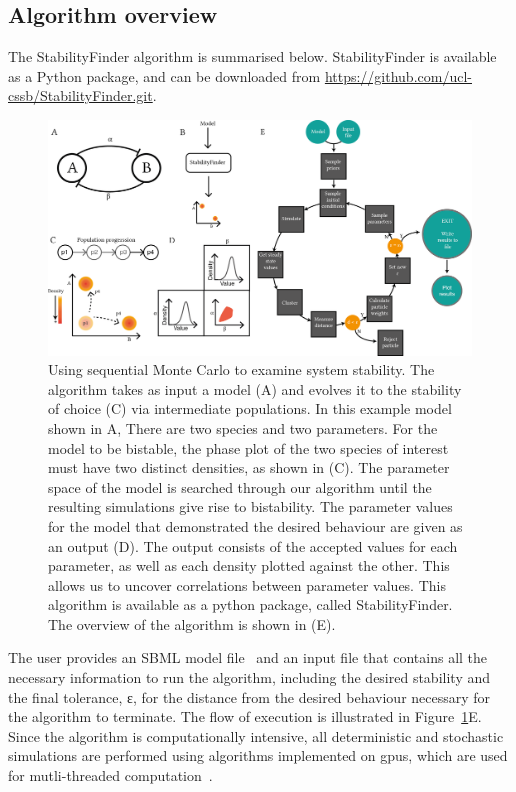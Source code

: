 \subsection{Algorithm overview}
\label{sec:Alg_overview}
The StabilityFinder algorithm is summarised below. StabilityFinder is available as a Python package, and can be downloaded from \url{https://github.com/ucl-cssb/StabilityFinder.git}. 

\begin{figure}[h]
\begin{center}
\includegraphics[scale=0.9]{../../chapters/chapterStabilityFinder/images/SF_algo_overv.png}
\caption[StabilityFinder algorithm overview]{\label{fig:fig1}Using sequential Monte Carlo to examine system stability. The algorithm takes as input a model (A) and evolves it to the stability of choice (C) via intermediate populations. In this example model shown in A, There are two species and two parameters. For the model to be bistable, the phase plot of the two species of interest must have two distinct densities, as shown in (C). The parameter space of the model is searched through our algorithm until the resulting simulations give rise to bistability. The parameter values for the model that demonstrated the desired behaviour are given as an output (D). The output consists of the accepted values for each parameter, as well as each density plotted against the other. This allows us to uncover correlations between parameter values. This algorithm is available as a python package, called StabilityFinder. The overview of the algorithm is shown in (E).}
\end{center}
\end{figure}
\clearpage

The user provides an SBML model file~\autocite{Finney:2003vk, Hucka:2004wh} and an input file that contains all the necessary information to run the algorithm, including the desired stability and the final tolerance, ε, for the distance from the desired behaviour necessary for the algorithm to terminate. The flow of execution is illustrated in Figure~\ref{fig:fig1}E. Since the algorithm is computationally intensive, all deterministic and stochastic simulations are performed using algorithms implemented on \acrfull{gpu}s, which are used for mutli-threaded computation~\autocite{Kirk:2010we}.


